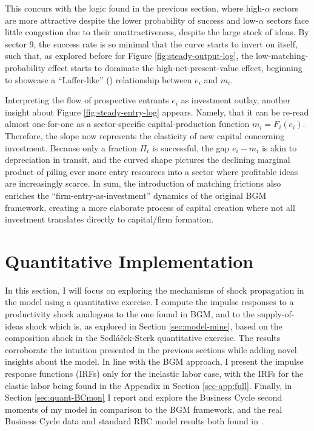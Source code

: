 \documentclass[a4paper,12pt]{article} %
\numberwithin{equation}{section} %
\numberwithin{figure}{section}
\numberwithin{table}{section}
\begin{document}
This concurs with the logic found in the previous section, where high-$\alpha$ sectors are more attractive despite the lower probability
of success and low-$\alpha$ sectors face little congestion due to their unattractiveness, despite the large stock of ideas.
By sector 9, the success rate is so minimal that the curve starts to invert on itself, such that, as explored before for 
Figure \ref{fig:steady-output-log}, the low-matching-probability effect starts to dominate the high-net-present-value effect, beginning
to showcase a ``Laffer-like'' (\cite{laffer1974balance}) relationship between $e_i$ and $m_i$.

Interpreting the flow of prospective entrants $e_i$ as investment outlay, another insight about Figure \ref{fig:steady-entry-log} appears.
Namely, that it can be re-read almost one-for-one as a sector-specific capital-production function $m_i = F_i(e_i)$.
Therefore, the slope now represents the elasticity of new capital concerning investment. Because only a fraction $\Pi_i$ is 
successful, the gap $e_i - m_i$ is akin to depreciation in transit, and the curved shape pictures the declining marginal 
product of piling ever more entry resources into a sector where profitable ideas are increasingly scarce. In sum, the introduction of
matching frictions also enriches the ``firm-entry-as-investment'' dynamics of the original BGM framework, creating a more elaborate
process of capital creation where not all investment translates directly to  capital/firm formation.


\section{Quantitative Implementation}
\label{sec:quant}

In this section, I will focus on exploring the mechanisms of shock propagation in the model using a quantitative exercise.
I compute the impulse responses to a productivity shock analogous to the one found in BGM, and to the supply-of-ideas shock which is,
as explored in Section \ref{sec:model-mine}, based on the composition shock in the Sedláček-Sterk quantitative exercise. 
The results corroborate the intuition presented in the previous sections while adding novel insights about the model. In line with the 
BGM approach, I present the impulse response functions (IRFs) only for the inelastic labor case, with the IRFs for the elastic labor
being found in the Appendix in Section \ref{sec-app:full}. Finally, in Section \ref{sec:quant-BCmon} I report and explore the 
Business Cycle second moments of my model
in comparison to the BGM framework, and the real Business Cycle data and standard RBC model results both found in 
\textcite{king1999resuscitating}.
\end{document}
